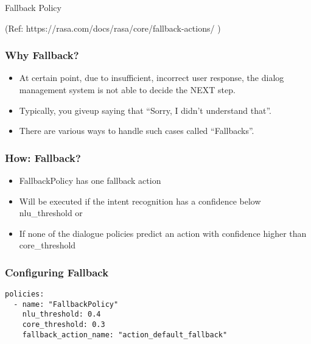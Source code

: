 \begin{frame}[fragile]\frametitle{}
\begin{center}
{\Large Fallback Policy}

{\tiny (Ref: https://rasa.com/docs/rasa/core/fallback-actions/ )}
\end{center}
\end{frame}

 \begin{frame}[fragile]\frametitle{Why Fallback?}
\begin{itemize}
\item At certain point, due to insufficient, incorrect user response, the dialog management system is not able to decide the NEXT step.
\item Typically, you give\-up saying that ``Sorry, I didn’t understand that''.
\item There are various ways to handle such cases called ``Fallbacks''.
\end{itemize}
\end{frame}

 \begin{frame}[fragile]\frametitle{How: Fallback?}
\begin{itemize}
\item FallbackPolicy has one fallback action
\item Will be executed if the intent recognition has a confidence below nlu\_threshold or
\item If none of the dialogue policies predict an action with confidence higher than core\_threshold
\end{itemize}
\end{frame}

 \begin{frame}[fragile]\frametitle{Configuring Fallback}
\begin{lstlisting}
policies:
  - name: "FallbackPolicy"
    nlu_threshold: 0.4
    core_threshold: 0.3
    fallback_action_name: "action_default_fallback"
\end{lstlisting}
\end{frame}

